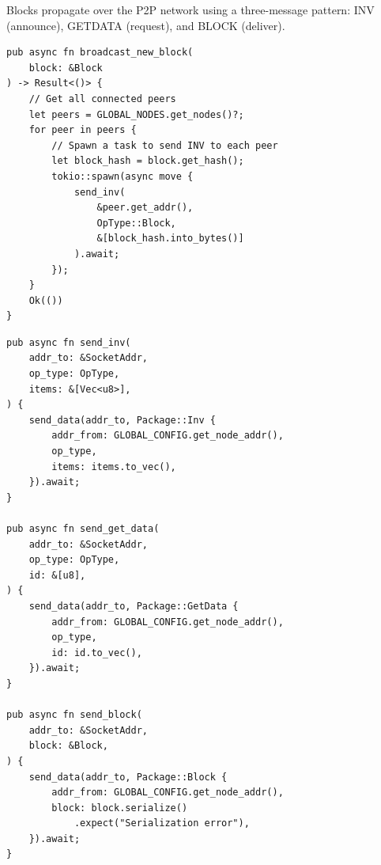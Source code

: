 Blocks propagate over the P2P network using a three-message pattern: INV (announce), GETDATA (request), and BLOCK (deliver).

\begin{listing}[htbp]
\caption{Announce new block ()}
\label{lst:9-6-9}
\begin{verbatim}
pub async fn broadcast_new_block(
    block: &Block
) -> Result<()> {
    // Get all connected peers
    let peers = GLOBAL_NODES.get_nodes()?;
    for peer in peers {
        // Spawn a task to send INV to each peer
        let block_hash = block.get_hash();
        tokio::spawn(async move {
            send_inv(
                &peer.get_addr(),
                OpType::Block,
                &[block_hash.into_bytes()]
            ).await;
        });
    }
    Ok(())
}
\end{verbatim}
\end{listing}

\begin{listing}[htbp]
\caption{P2P broadcast primitives (, , )}
\label{lst:9-6-10}
\begin{verbatim}
pub async fn send_inv(
    addr_to: &SocketAddr,
    op_type: OpType,
    items: &[Vec<u8>],
) {
    send_data(addr_to, Package::Inv {
        addr_from: GLOBAL_CONFIG.get_node_addr(),
        op_type,
        items: items.to_vec(),
    }).await;
}

pub async fn send_get_data(
    addr_to: &SocketAddr,
    op_type: OpType,
    id: &[u8],
) {
    send_data(addr_to, Package::GetData {
        addr_from: GLOBAL_CONFIG.get_node_addr(),
        op_type,
        id: id.to_vec(),
    }).await;
}

pub async fn send_block(
    addr_to: &SocketAddr,
    block: &Block,
) {
    send_data(addr_to, Package::Block {
        addr_from: GLOBAL_CONFIG.get_node_addr(),
        block: block.serialize()
            .expect("Serialization error"),
    }).await;
}
\end{verbatim}
\end{listing}

